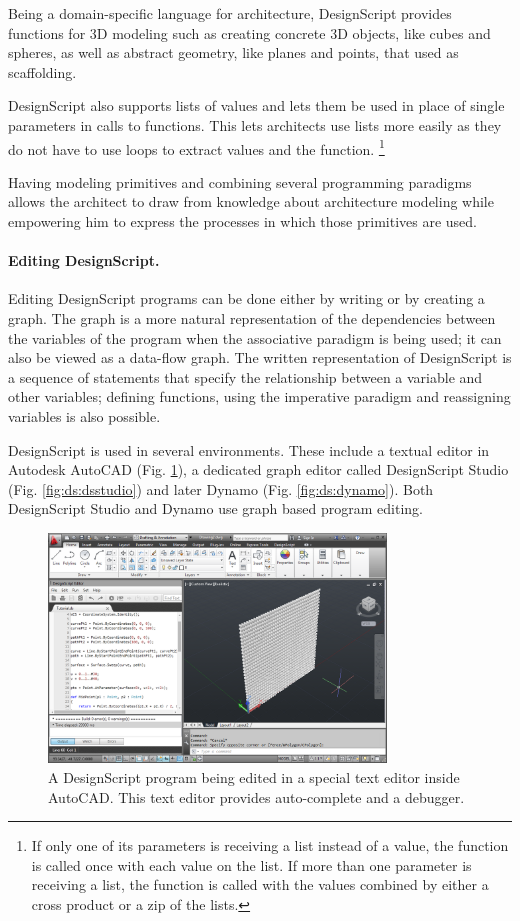 \documentclass{./llncs2e/llncs}
\begin{document}
	Being a domain-specific language for architecture, DesignScript provides functions for 3D modeling such as creating concrete 3D objects, like cubes and spheres, as well as abstract geometry, like planes and points, that used as scaffolding.
	
	DesignScript also supports lists of values and lets them be used in place of single parameters in calls to functions.
	This lets architects use lists more easily as they do not have to use loops to extract values and the function.
	\footnote{If only one of its parameters is receiving a list instead of a value, the function is called once with each value on the list.
	If more than one parameter is receiving a list, the function is called with the values combined by either a cross product or a zip of the lists.}
	
	Having modeling primitives and combining several programming paradigms allows the architect to draw from knowledge about architecture modeling while empowering him to express the processes in which those primitives are used.
	
	\paragraph{Editing DesignScript.}
	Editing DesignScript programs can be done either by writing or by creating a graph. 
	The graph is a more natural representation of the dependencies between the variables of the program when the associative paradigm is being used; it can also be viewed as a data-flow graph. 
	The written representation of DesignScript is a sequence of statements that specify the relationship between a variable and other variables; defining functions, using the imperative paradigm and reassigning variables is also possible.
	
	DesignScript is used in several environments. 
	These include a textual editor in Autodesk AutoCAD (Fig. \ref{fig:ds:autocad}), a dedicated graph editor called DesignScript Studio (Fig. \ref{fig:ds:dsstudio}) and later Dynamo (Fig. \ref{fig:ds:dynamo}). 
	Both DesignScript Studio and Dynamo use graph based program editing.
	
	\begin{figure}
		\centering
		\includegraphics[width=0.8\textwidth]{img/ds_autocad}
		\caption{A DesignScript program being edited in a special text editor inside AutoCAD. This text editor provides auto-complete and a debugger.}
		\label{fig:ds:autocad}
	\end{figure} 
	
\end{document}
